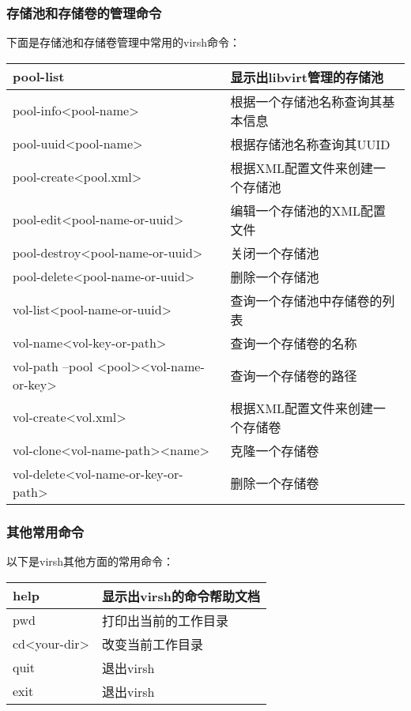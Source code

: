 \documentclass[a4paper,left=2.5cm,right=2.5cm,11pt]{article}
\begin{document}
\subsubsection{存储池和存储卷的管理命令}
	下面是存储池和存储卷管理中常用的virsh命令：
	\begin{longtable}{p{6cm}p{7cm}}
	\hline
	pool-list & 显示出libvirt管理的存储池 \\
	\hline
	pool-info<pool-name> & 根据一个存储池名称查询其基本信息 \\
	\hline
	pool-uuid<pool-name> & 根据存储池名称查询其UUID \\
	\hline
	pool-create<pool.xml> & 根据XML配置文件来创建一个存储池 \\
	\hline
	pool-edit<pool-name-or-uuid> & 编辑一个存储池的XML配置文件 \\
	\hline
	pool-destroy<pool-name-or-uuid> & 关闭一个存储池 \\
	\hline
	pool-delete<pool-name-or-uuid> & 删除一个存储池 \\
	\hline
	vol-list<pool-name-or-uuid> & 查询一个存储池中存储卷的列表 \\
	\hline
	vol-name<vol-key-or-path> & 查询一个存储卷的名称 \\
	\hline
	vol-path --pool <pool><vol-name-or-key> & 查询一个存储卷的路径 \\
	\hline
	vol-create<vol.xml> & 根据XML配置文件来创建一个存储卷 \\
	\hline
	vol-clone<vol-name-path><name> & 克隆一个存储卷 \\
	\hline
	vol-delete<vol-name-or-key-or-path> & 删除一个存储卷 \\
	\hline
	\end{longtable}

\subsubsection{其他常用命令}
	以下是virsh其他方面的常用命令：
	\begin{longtable}{p{5cm}p{7cm}}
	\hline
	help & 显示出virsh的命令帮助文档 \\
	\hline
	pwd & 打印出当前的工作目录 \\
	\hline
	cd<your-dir> & 改变当前工作目录 \\
	\hline
	quit & 退出virsh \\
	\hline
	exit & 退出virsh \\
	\hline
	\end{longtable}

\clearpage
\end{document}
